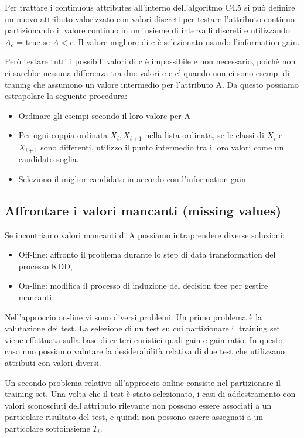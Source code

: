 \documentclass[a4paper]{extarticle}
\begin{document}
Per trattare i continuous attributes all'interno dell'algoritmo C4.5 si può definire un nuovo attributo valorizzato con valori discreti per testare l'attributo continuo partizionando il valore continuo in un insieme di intervalli discreti e utilizzando $A_c$ = true se $A<c$. Il valore migliore di c è selezionato usando l'information gain.

Però testare tutti i possibili valori di c è impossibile e non necessario, poichè non ci sarebbe nessuna differenza tra due valori c e c' quando non ci sono esempi di traning che assumono un valore intermedio per l'attributo A. Da questo possiamo estrapolare la seguente procedura:

\begin{itemize}
\item Ordinare gli esempi secondo il loro valore per A
\item Per ogni coppia ordinata $X_i,X_{i+1}$ nella lista ordinata, se le classi di $X_i$ e $X_{i+1}$ sono differenti, utilizzo il punto intermedio tra i loro valori come un candidato soglia.
\item Seleziono il miglior candidato in accordo con l'information gain
\end{itemize}

\subsection{Affrontare i valori mancanti (missing values)}

Se incontriamo valori mancanti di A possiamo intraprendere diverse soluzioni:
\begin{itemize}
\item Off-line: affronto il problema durante lo step di data transformation del processo KDD,
\item On-line: modifica il processo di induzione del decision tree per gestire mancanti.
\end{itemize}

Nell'approccio on-line vi sono diversi problemi. Un primo problema è la valutazione dei test. La selezione di un test su cui partizionare il training set viene effettuata sulla base di criteri euristici quali gain e gain ratio. In questo caso nno possiamo valutare la desiderabilità relativa di due test che utilizzano attributi con valori diversi.

Un secondo problema relativo all'approccio online consiste nel partizionare il training set. Una volta che il test è stato selezionato, i casi di addestramento con valori sconosciuti dell'attributo rilevante non possono essere associati a un particolare risultato del test, e quindi non possono essere assegnati a un particolare sottoinsieme $T_i$.
\end{document}
